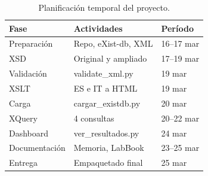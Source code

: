 \documentclass[10pt,twocolumn,a4paper]{article}
\begin{document}
\begin{table}[H]
\centering
\caption{Planificaci\'on temporal del proyecto.}
\label{tab:planning}
\begin{tabular}{p{1.8cm}p{2.8cm}l}
\toprule
\textbf{Fase} & \textbf{Actividades} & \textbf{Per\'iodo} \\
\midrule
Preparaci\'on & Repo, eXist-db, XML & 16--17 mar \\
XSD           & Original y ampliado & 17--19 mar \\
Validaci\'on  & validate\_xml.py    & 19 mar \\
XSLT          & ES e IT a HTML      & 19 mar \\
Carga         & cargar\_existdb.py  & 20 mar \\
XQuery        & 4 consultas         & 20--22 mar \\
Dashboard     & ver\_resultados.py  & 24 mar \\
Documentaci\'on & Memoria, LabBook  & 23--25 mar \\
Entrega       & Empaquetado final   & 25 mar \\
\bottomrule
\end{tabular}
\end{table}
\end{document}
